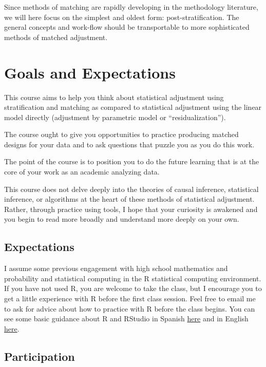 \documentclass[10pt,letterpaper]{article}
\newenvironment{introstuff} {\setcounter{secnumdepth}{0}%
} {\setcounter{secnumdepth}{1}%
\restoregeometry
}
\begin{document}
\begin{introstuff}
  Since methods of matching are rapidly developing in the methodology literature, we will here focus on the simplest and oldest form: post-stratification. The general concepts and work-flow should be transportable to more sophisticated methods of matched adjustment.

  \section{Goals and Expectations}

  This course aims to help you think about statistical adjustment using
  stratification and matching as compared to statistical adjustment using the
  linear model directly (adjustment by parametric model or ``residualization'').

  The course ought to give you opportunities to practice producing
  matched designs for your data and to ask questions that puzzle you as
  you do this work.

  The point of the course is to position you to do the future learning
  that is at the core of your work as an academic analyzing data.

  This course does not delve deeply into the theories of causal
  inference, statistical inference, or algorithms at the heart of these
  methods of statistical adjustment. Rather, through practice using
  tools, I hope that your curiosity is awakened and you begin to read
  more broadly and understand more deeply on your own.

  \subsection{Expectations}

  I assume some previous engagement with high school mathematics and
  probability and statistical computing in the R statistical computing
  environment. If you have not used R, you are welcome to take the class, but I
  encourage you to get a little experience with R before the first class
  session. Feel free to email me to ask for advice about how to practice with R
  before the class begins. You can see some basic guidance about R and RStudio
  in Spanish \href{https://egap.github.io/theory_and_practice_of_field_experiments_spanish/introducci%C3%B3n-a-r-y-rstudio.html}{here} and in English \href{https://egap.github.io/theory_and_practice_of_field_experiments/introduction-to-r-and-rstudio.html}{here}.

  \subsection{Participation}


\end{introstuff}
\end{document}
